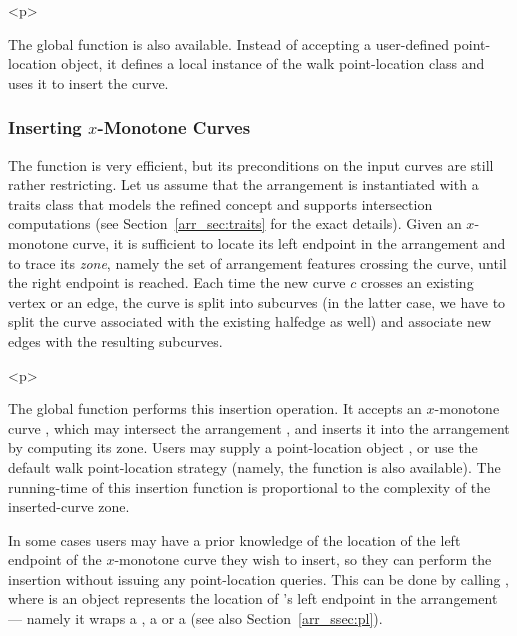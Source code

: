 \begin{ccHtmlOnly}<p>\end{ccHtmlOnly}
The global function  is also
available. Instead of accepting a user-defined point-location
object, it defines a local instance of the walk point-location
class and uses it to insert the curve.

\subsubsection{Inserting $x$-Monotone Curves}
\label{arr_sssec:insert_x_mon}
%
The  function is very
efficient, but its preconditions on the input curves are still
rather restricting. Let us assume that the arrangement is
instantiated with a traits class that models the refined
 concept and supports
intersection computations (see Section~\ref{arr_sec:traits} for
the exact details). Given an $x$-monotone curve, it is sufficient
to locate its left endpoint in the arrangement and to trace its
{\em zone}, namely the set of arrangement features crossing the curve,
until the right endpoint is reached. Each time the new curve $c$
crosses an existing vertex or an edge, the curve is split into
subcurves (in the latter case, we have to split the curve 
associated with the existing halfedge as well) and associate new
edges with the resulting subcurves.

\begin{ccHtmlOnly}<p>\end{ccHtmlOnly}
The global function  performs
this insertion operation. It accepts an $x$-monotone curve ,
which may intersect the arrangement , and inserts it into
the arrangement by computing its zone. Users may supply a
point-location object , or use the default walk
point-location strategy (namely, the function
 is also available). The
running-time of this insertion function is proportional to the
complexity of the inserted-curve zone.

\begin{ccAdvanced}
In some cases users may have a prior knowledge of the location of the
left endpoint of the $x$-monotone curve  they wish to insert,
so they can perform the insertion without issuing any point-location
queries. This can be done by calling
, where  is an
object represents the location of 's left endpoint in the
arrangement --- namely it wraps a , a
 or a  (see
also Section~\ref{arr_ssec:pl}).
\end{ccAdvanced}

